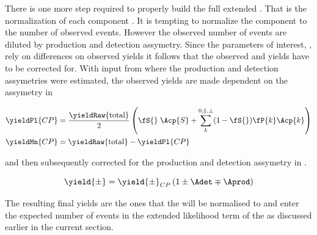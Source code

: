 There is one more step required to properly build the full extended \pdf. That is the normalization of each component \pdf. It is tempting to 
normalize the component \pdfs to the number of observed events. However the observed number of events are diluted by production and detection
assymetry. Since the parameters of interest, \ACP, rely on differences on observed yields it follows that the observed \BsbarJpsiKst and \BsJpsiKst 
yields have to be corrected for. With input from  where the production and detection assymetries were estimated, the 
observed yields are made dependent on the \ACP assymetry in  

\begin{align}
\yieldPl{CP} &= \frac{ \yieldRaw{\text{total}} }{2} \left( \fS{}\; \Acp{S} + \sum_k^{0,\parallel,\perp} (1-\fS{})\fP{k}\Acp{k}  \right) \nonumber \\
\yieldMn{CP} &=  \yieldRaw{\text{total}} - \yieldPl{CP} 
\label{acp_yields}
\end{align}

\noindent and then subsequently corrected for the production and detection assymetry in . 

\begin{equation}
\yield{\pm} = \yield{\pm}_{CP}  \left( 1 \pm \Adet \mp \Aprod \right)
\label{norm_yields}
\end{equation}

The resulting final yields are the ones that the \pdfs will be normalised to and enter the expected number of events in the extended likelihood term 
of the \pdfs as discussed earlier in the current section. 
